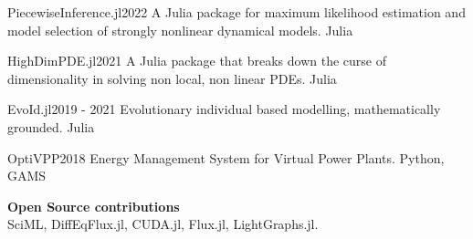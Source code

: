 %
%
%


\begin{projects}
	\project
	{PiecewiseInference.jl}{2022}
	{  }
	{A Julia package for maximum likelihood estimation and model selection of strongly nonlinear dynamical models.}
	{Julia}
	
	\project
	{HighDimPDE.jl}{2021}
	{  }
	{A Julia package that breaks down the curse of dimensionality in solving non local, non linear PDEs.}
	{Julia}
				
	\project
	{EvoId.jl}{2019 - 2021}
	{  }
	{Evolutionary individual based modelling, mathematically grounded.}
	{Julia}
	
    \project
	{OptiVPP}{2018}
	{}
	{Energy Management System for Virtual Power Plants.}
	{Python, GAMS}
	
	\textbf{Open Source contributions}\\
	SciML, DiffEqFlux.jl, CUDA.jl, Flux.jl, LightGraphs.jl.
\end{projects}